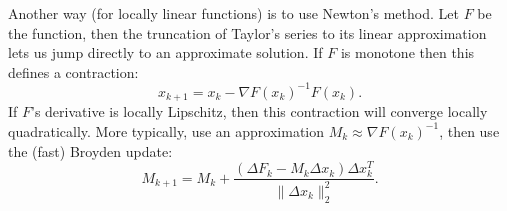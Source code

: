 \documentclass[12pt]{article}
\begin{document}
Another way (for locally linear functions) is to use Newton's method.
Let $F$ be the function, then the truncation of Taylor's series to its linear
approximation lets us jump directly to an approximate solution.
If $F$ is monotone then this defines a contraction:
$$
x_{k+1} = x_k - \nabla F(x_k)^{-1} F(x_k).
$$
If $F$'s derivative is locally Lipschitz, then this contraction will converge 
locally quadratically.
More typically, use an approximation 
$M_k \approx \nabla F(x_k)^{-1}$, then use the (fast) Broyden update:
$$
M_{k+1} = M_k + \frac{(\Delta F_k - M_{k}\Delta x_k)\Delta x_k^T}{\|\Delta x_k\|_2^2}.
$$
\end{document}
